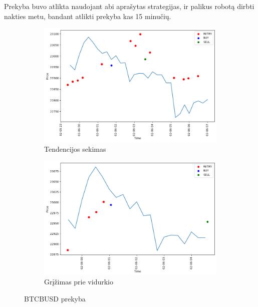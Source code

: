 \documentclass{VUMIFInfKursinis}
\begin{document}
Prekyba buvo atlikta naudojant abi aprašytas strategijas, ir palikus robotą dirbti nakties metu, bandant atlikti prekyba kas
15 minučių.


\begin{figure}[H]
  \centering
  \begin{subfigure}{.5\textwidth}
    \centering
    \includegraphics[width=\linewidth]{img/BTCBUSD_ARIMA_trades.png}
    \caption{Tendencijos sekimas}
    \label{fig:btcbusd_arima_trades}
  \end{subfigure}%
  \begin{subfigure}{.5\textwidth}
    \centering
    \includegraphics[width=\linewidth]{img/BTCBUSD_SMA_trades.png}
    \caption{Grįžimas prie vidurkio}
    \label{fig:btcbusd_sma_trades}
  \end{subfigure}
  \caption{BTCBUSD prekyba}
  \label{fig:btcbusd_trades}
\end{figure}
\end{document}
